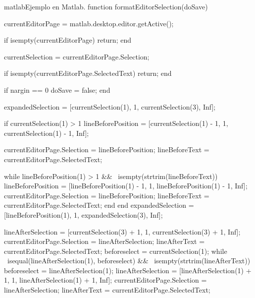 \begin{sourcecode}{matlab}{Ejemplo en Matlab.}
        function formatEditorSelection(doSave)
            
            currentEditorPage = matlab.desktop.editor.getActive();
            
            if isempty(currentEditorPage)
                return;
            end
            
            currentSelection = currentEditorPage.Selection;
            
            if isempty(currentEditorPage.SelectedText)
                return;
            end
            
            if nargin == 0
                doSave = false;
            end
            
            expandedSelection = [currentSelection(1), 1, currentSelection(3), Inf];
            
            
            if currentSelection(1) > 1
                lineBeforePosition = [currentSelection(1) - 1, 1, currentSelection(1) - 1, Inf];
                
                currentEditorPage.Selection = lineBeforePosition;
                lineBeforeText = currentEditorPage.SelectedText;
                
                while lineBeforePosition(1) > 1 && ~isempty(strtrim(lineBeforeText))
                    lineBeforePosition = [lineBeforePosition(1) - 1, 1, lineBeforePosition(1) - 1, Inf];
                    currentEditorPage.Selection = lineBeforePosition;
                    lineBeforeText = currentEditorPage.SelectedText;
                end
            end
            expandedSelection = [lineBeforePosition(1), 1, expandedSelection(3), Inf];
            
            lineAfterSelection = [currentSelection(3) + 1, 1, currentSelection(3) + 1, Inf];
            currentEditorPage.Selection = lineAfterSelection;
            lineAfterText = currentEditorPage.SelectedText;
            beforeselect = currentSelection(1);
            while ~isequal(lineAfterSelection(1), beforeselect) && ~isempty(strtrim(lineAfterText))
                beforeselect = lineAfterSelection(1);
                lineAfterSelection = [lineAfterSelection(1) + 1, 1, lineAfterSelection(1) + 1, Inf];
                currentEditorPage.Selection = lineAfterSelection;
                lineAfterText = currentEditorPage.SelectedText;
                

\end{sourcecode}
